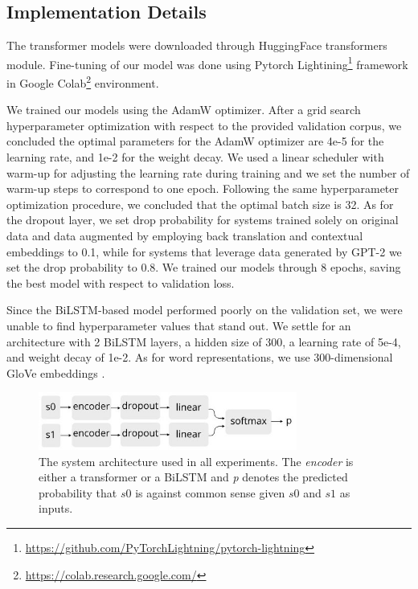 \documentclass[10pt, a4paper]{article}
\begin{document}
\subsection{Implementation Details}

The transformer models were downloaded through HuggingFace transformers \citep{wolf-etal-2020-transformers} module. Fine-tuning of our model was done using Pytorch Lightining\footnote{\href{https://github.com/PyTorchLightning/pytorch-lightning}{https://github.com/PyTorchLightning/pytorch-lightning}} framework in Google Colab\footnote{\href{https://colab.research.google.com/}{https://colab.research.google.com/}} environment.

We trained our models using the AdamW optimizer. After a grid search hyperparameter optimization with respect to the provided validation corpus, we concluded the optimal parameters for the AdamW optimizer are 4e-5 for the learning rate, and 1e-2 for the weight decay. We used a linear scheduler with warm-up for adjusting the learning rate during training and we set the number of warm-up steps to correspond to one epoch. Following the same hyperparameter optimization procedure, we concluded that the optimal batch size is 32. As for the dropout layer, we set drop probability for systems trained solely on original data and data augmented by employing back translation and contextual embeddings to 0.1, while for systems that leverage data generated by GPT-2 we set the drop probability to 0.8. We trained our models through 8 epochs, saving the best model with respect to validation loss.

Since the BiLSTM-based model performed poorly on the validation set, we were unable to find hyperparameter values that stand out. We settle for an architecture with 2 BiLSTM layers, a hidden size of 300, a learning rate of 5e-4, and weight decay of 1e-2. As for word representations, we use 300-dimensional GloVe embeddings \citep{pennington2014glove}.


\begin{figure} 
    \centering
    \includegraphics[width=8.5cm]{images/model14.jpg}
    \caption{The system architecture used in all experiments. The \textit{encoder} is either a transformer or a BiLSTM and \textit{p} denotes the predicted probability that $s0$ is against common sense given $s0$ and $s1$ as inputs.}
    \label{fig:model}
\end{figure}
\end{document}
